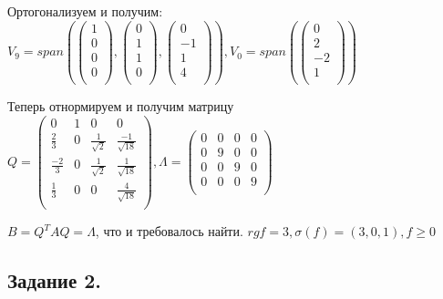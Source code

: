 \documentclass{article}
\renewcommand{\span}{span}
\begin{document}
Ортогонализуем и получим:
$V_9 = \span (\begin{pmatrix}
    1 \\
    0\\
    0\\
    0\\
\end{pmatrix}, \begin{pmatrix}
    0 \\
    1\\
    1\\
    0\\
\end{pmatrix}, \begin{pmatrix}
    0 \\
    -1\\
    1\\
    4\\
\end{pmatrix}),V_0 = \span (\begin{pmatrix}
    0 \\
    2\\
    -2\\
    1\\
\end{pmatrix})$

Теперь отнормируем и получим матрицу $Q = \begin{pmatrix}
    0 & 1 & 0 & 0\\
    \frac{2}{3} & 0 & \frac{1}{\sqrt{2}}& \frac{-1}{\sqrt{18}}\\
    \frac{-2}{3} & 0 & \frac{1}{\sqrt{2}} & \frac{1}{\sqrt{18}}\\
    \frac{1}{3}& 0 & 0 & \frac{4}{\sqrt{18}}\\
\end{pmatrix}, \Lambda = \begin{pmatrix}
    0 & 0 & 0 & 0\\
    0 & 9 & 0 & 0\\
    0 & 0 & 9 & 0\\
    0 & 0 & 0 & 9\\
\end{pmatrix}$



$B = Q^T A Q  = \Lambda$, что и требовалось найти. $rg f = 3, \sigma(f) = (3,0,1), f \geq 0 $
\newpage 

\subsection{Задание 2.}
\end{document}
